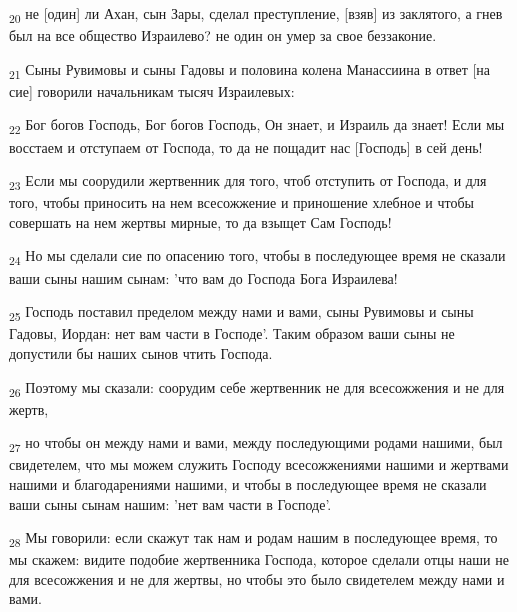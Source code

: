 \begin{tcolorbox}
\textsubscript{20} не [один] ли Ахан, сын Зары, сделал преступление, [взяв] из заклятого, а гнев был на все общество Израилево? не один он умер за свое беззаконие.
\end{tcolorbox}
\begin{tcolorbox}
\textsubscript{21} Сыны Рувимовы и сыны Гадовы и половина колена Манассиина в ответ [на сие] говорили начальникам тысяч Израилевых:
\end{tcolorbox}
\begin{tcolorbox}
\textsubscript{22} Бог богов Господь, Бог богов Господь, Он знает, и Израиль да знает! Если мы восстаем и отступаем от Господа, то да не пощадит нас [Господь] в сей день!
\end{tcolorbox}
\begin{tcolorbox}
\textsubscript{23} Если мы соорудили жертвенник для того, чтоб отступить от Господа, и для того, чтобы приносить на нем всесожжение и приношение хлебное и чтобы совершать на нем жертвы мирные, то да взыщет Сам Господь!
\end{tcolorbox}
\begin{tcolorbox}
\textsubscript{24} Но мы сделали сие по опасению того, чтобы в последующее время не сказали ваши сыны нашим сынам: 'что вам до Господа Бога Израилева!
\end{tcolorbox}
\begin{tcolorbox}
\textsubscript{25} Господь поставил пределом между нами и вами, сыны Рувимовы и сыны Гадовы, Иордан: нет вам части в Господе'. Таким образом ваши сыны не допустили бы наших сынов чтить Господа.
\end{tcolorbox}
\begin{tcolorbox}
\textsubscript{26} Поэтому мы сказали: соорудим себе жертвенник не для всесожжения и не для жертв,
\end{tcolorbox}
\begin{tcolorbox}
\textsubscript{27} но чтобы он между нами и вами, между последующими родами нашими, был свидетелем, что мы можем служить Господу всесожжениями нашими и жертвами нашими и благодарениями нашими, и чтобы в последующее время не сказали ваши сыны сынам нашим: 'нет вам части в Господе'.
\end{tcolorbox}
\begin{tcolorbox}
\textsubscript{28} Мы говорили: если скажут так нам и родам нашим в последующее время, то мы скажем: видите подобие жертвенника Господа, которое сделали отцы наши не для всесожжения и не для жертвы, но чтобы это было свидетелем между нами и вами.
\end{tcolorbox}
